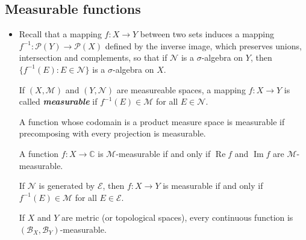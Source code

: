 \documentclass{article}
\theoremstyle{definition}
\numberwithin{equation}{section}
\newcommand{\C}{\mathbb{C}}
\begin{document}
	\subsection{Measurable functions}
	\begin{itemize}
		\item Recall that a mapping $f:X\to Y$ between two sets induces a mapping $f^{-1}:\mathcal{P}(Y)\to\mathcal{P}(X)$ defined by the inverse image, which preserves unions, intersection and complements, so that if $\mathcal{N}$ is a $\sigma$-algebra on $Y$, then $\{f^{-1}(E):E\in\mathcal{N}\}$ is a $\sigma$-algebra on $X$.
		
		If $(X,\mathcal{M})$ and $(Y,\mathcal{N})$ are measureable spaces, a mapping $f:X\to Y$ is called \textbf{\textit{measurable}} if $f^{-1}(E)\in\mathcal{M}$ for all $E\in\mathcal{N}$.
		
		\begin{prop}
			A function whose codomain is a product measure space is measurable if precomposing with every projection is measurable.
		\end{prop}
		\begin{coro}
			A function $f:X\to\C$ is $\mathcal{M}$-measurable if and only if $\operatorname{Re} f$ and $\operatorname{Im} f$ are $\mathcal{M}$-measurable.
		\end{coro}
		
		\begin{prop}
			If $\mathcal{N}$ is generated by $\mathcal{E}$, then $f:X\to Y$ is measurable if and only if $f^{-1}(E)\in\mathcal{M}$ for all $E\in\mathcal{E}$.
		\end{prop}
		\begin{coro}
			If $X$ and $Y$ are metric (or topological spaces), every continuous function is $(\mathcal{B}_X,\mathcal{B}_Y)$-measurable.
		\end{coro}
		

\end{itemize}
\end{document}
